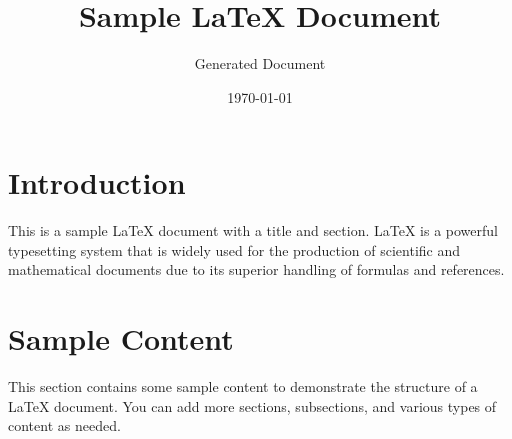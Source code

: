 \documentclass{article}
\title{Sample LaTeX Document}
\author{Generated Document}
\date{\today}
\begin{document}
\maketitle

\section{Introduction}
This is a sample LaTeX document with a title and section. LaTeX is a powerful typesetting system that is widely used for the production of scientific and mathematical documents due to its superior handling of formulas and references.

\section{Sample Content}
This section contains some sample content to demonstrate the structure of a LaTeX document. You can add more sections, subsections, and various types of content as needed.
\end{document}
